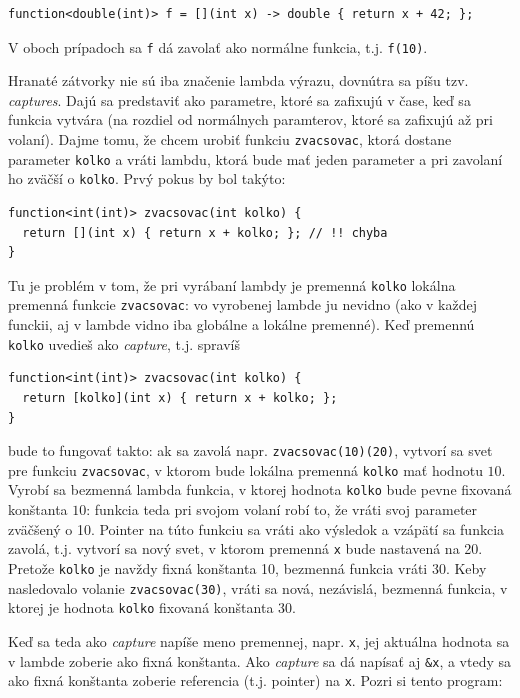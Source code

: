 \documentclass[10pt]{article}
\def\prg{\lstinline}
\def\ods{\vspace*{10pt}}
\begin{document}
{\begin{lstlisting}
function<double(int)> f = [](int x) -> double { return x + 42; };
\end{lstlisting}

V oboch prípadoch sa {\tt f} dá zavolať ako normálne funkcia, t.j. {\tt f(10)}. 

\ods Hranaté zátvorky nie sú iba značenie lambda výrazu, dovnútra sa píšu tzv. 
{\em captures}. Dajú sa predstaviť ako parametre, ktoré sa zafixujú v čase, keď sa
funkcia vytvára (na rozdiel od normálnych paramterov, ktoré sa zafixujú až pri volaní).
Dajme tomu, že chcem urobiť funkciu {\tt zvacsovac}, ktorá dostane parameter {\tt kolko}
a vráti lambdu, ktorá bude mať jeden parameter a pri zavolaní ho zväčší o {\tt kolko}.
Prvý pokus by bol takýto:

\begin{lstlisting}
function<int(int)> zvacsovac(int kolko) {
  return [](int x) { return x + kolko; }; // !! chyba
}
\end{lstlisting}

Tu je problém v tom, že pri vyrábaní lambdy je premenná {\tt kolko} lokálna premenná
funkcie {\tt zvacsovac}: vo vyrobenej lambde ju nevidno (ako v každej funckii, aj 
v lambde vidno
iba globálne a lokálne premenné). Keď premennú {\tt kolko} uvedieš ako {\em capture},
t.j. spravíš

\begin{lstlisting}
function<int(int)> zvacsovac(int kolko) {
  return [kolko](int x) { return x + kolko; };
}
\end{lstlisting}

bude to fungovať takto: ak sa zavolá napr. \prg!zvacsovac(10)(20)!, vytvorí sa svet
pre funkciu {\tt zvacsovac}, v ktorom bude lokálna premenná {\tt kolko} mať hodnotu $10$.
Vyrobí sa bezmenná lambda funkcia, v ktorej hodnota {\tt kolko} bude pevne fixovaná
konštanta $10$: funkcia teda pri svojom volaní robí to, že vráti svoj parameter zväčšený o 10.
Pointer na túto funkciu sa vráti ako výsledok a vzápätí sa funkcia zavolá,
t.j. vytvorí sa nový svet, v ktorom premenná {\tt x} bude nastavená na 20. Pretože 
{\tt kolko} je navždy fixná konštanta 10, bezmenná funkcia vráti 30. Keby nasledovalo
volanie {\tt zvacsovac(30)}, vráti sa nová, nezávislá, bezmenná funkcia, v ktorej je hodnota 
{\tt kolko} fixovaná konštanta 30.

\ods 
Keď sa teda ako {\em capture} napíše meno premennej, napr. {\tt x},
jej aktuálna hodnota sa v lambde 
zoberie ako fixná konštanta. Ako {\em capture} sa dá napísať aj \prg!&x!,
a vtedy sa ako fixná konštanta zoberie referencia (t.j. pointer) na {\tt x}. 
Pozri si tento program:

}
\end{document}
